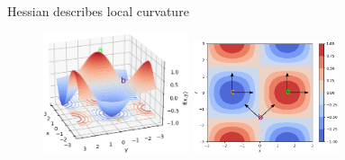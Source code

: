 \begin{vbframe}{Hessian describes local curvature}
\begin{figure}[!tbp]
    \includegraphics[width=0.38\textwidth]{figure_man/hessian_3d.png}
    \hspace{0.5cm}
    \includegraphics[width=0.38\textwidth]{figure_man/hessian_contour.png}
\end{figure} 

\end{vbframe}



